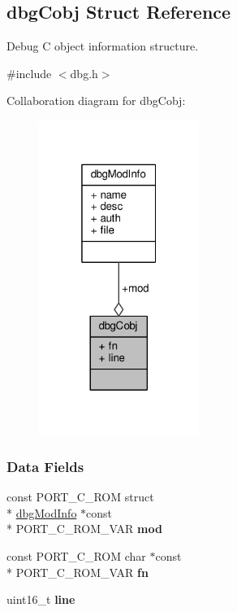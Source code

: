 \hypertarget{structdbgCobj}{\subsection{dbg\-Cobj Struct Reference}
\label{structdbgCobj}
}


Debug C object information structure.  




{\ttfamily \#include $<$dbg.\-h$>$}



Collaboration diagram for dbg\-Cobj\-:\nopagebreak
\begin{figure}[H]
\begin{center}
\leavevmode
\includegraphics[width=148pt]{structdbgCobj__coll__graph}
\end{center}
\end{figure}
\subsubsection*{Data Fields}
\begin{DoxyCompactItemize}
\item 
\hypertarget{structdbgCobj_aadd2f67f1fc36c5b4fe1132307b00c49}{const P\-O\-R\-T\-\_\-\-C\-\_\-\-R\-O\-M struct \\*
\hyperlink{structdbgModInfo}{dbg\-Mod\-Info} $\ast$const \\*
P\-O\-R\-T\-\_\-\-C\-\_\-\-R\-O\-M\-\_\-\-V\-A\-R {\bfseries mod}}\label{structdbgCobj_aadd2f67f1fc36c5b4fe1132307b00c49}

\item 
\hypertarget{structdbgCobj_af0284186e001dac39ffd940fa7e3821b}{const P\-O\-R\-T\-\_\-\-C\-\_\-\-R\-O\-M char $\ast$const \\*
P\-O\-R\-T\-\_\-\-C\-\_\-\-R\-O\-M\-\_\-\-V\-A\-R {\bfseries fn}}\label{structdbgCobj_af0284186e001dac39ffd940fa7e3821b}

\item 
\hypertarget{structdbgCobj_aa0285c4b23be303eb86c2c5441f108c6}{uint16\-\_\-t {\bfseries line}}\label{structdbgCobj_aa0285c4b23be303eb86c2c5441f108c6}

\end{DoxyCompactItemize}


